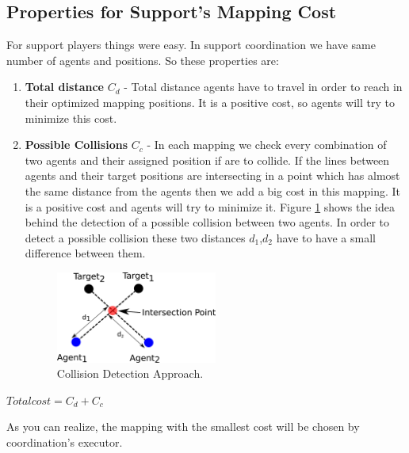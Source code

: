 \subsection{Properties for Support's Mapping Cost}
For support players things were easy. In support coordination we have same number of agents and positions. So these properties are:  
\begin{enumerate}
\item \textbf{Total distance }$C_{d}$ - Total distance agents have to travel in order to reach in their optimized mapping positions. It is a positive cost, so agents will try to minimize this cost.
\item \textbf{Possible Collisions }$C_{c}$ - In each mapping we check every combination of two agents and their assigned position if are to collide. If the lines between agents and their target positions are intersecting in a point which has almost the same distance from the agents then we add a big cost in this mapping. It is a positive cost and agents will try to minimize it. Figure \ref{fig:AvoidCollision} shows the idea behind the detection of a possible collision between two agents. In order to detect a possible collision these two distances $d_{1}$,$d_{2}$ have to have a small difference between them.
\begin{figure}[htb!]
\centering
  \includegraphics[width=0.5\textwidth]{Chapter4/figures/AvoidCollision.pdf}
  \caption{Collision Detection Approach.} 
  \label{fig:AvoidCollision}
\end{figure}
\end{enumerate}
\begin{center}
$Total cost = C_{d}+C_{c}$
\end{center}
As you can realize, the mapping with the smallest cost will be chosen by coordination's executor.

